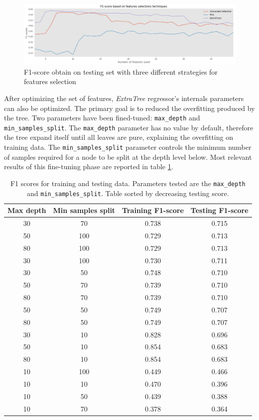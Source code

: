 \begin{figure}[!htbp]
    \centering
    \includegraphics[width=15cm]{images/feature_selection.png}
    \caption[F1-score based on feature selection]{F1-score obtain on testing set with three different strategies for features selection}
    \label{fig:feature-selection}
\end{figure}

After optimizing the set of features, \textit{ExtraTree} regressor's internals parameters can also be optimized. The primary goal is to reduced the overfitting produced by the tree. Two parameters have been fined-tuned: \texttt{max\_depth} and \texttt{min\_samples\_split}. The \texttt{max\_depth} parameter has no value by default, therefore the tree expand itself until all leaves are pure, explaining the overfitting on training data. The \texttt{min\_samples\_split} parameter controls the minimum number of samples required for a node to be split at the depth level below. Most relevant results of this fine-tuning phase are reported in table \ref{tab:tree-fine-tune}.

\begin{table}[!htbp]
    \centering
    \begin{tabular}{c|c|c|c}
    \textbf{Max depth} & \textbf{Min samples split} & \textbf{Training F1-score} & \textbf{Testing F1-score} \\ \hline
    30	&  70   &  	0.738  &  0.715 \\
    50	&  100  &  	0.729  &  0.713 \\
    80	&  100  &  	0.729  &  0.713 \\
    30	&  100  &  	0.730  &  0.711 \\
    30	&  50   &  	0.748  &  0.710 \\
    50	&  70   &  	0.739  &  0.710 \\
    80	&  70   &  	0.739  &  0.710 \\
    50	&  50   &  	0.749  &  0.707 \\
    80	&  50   &  	0.749  &  0.707 \\
    30	&  10   &  	0.828  &  0.696 \\
    50	&  10   &  	0.854  &  0.683 \\
    80	&  10   &  	0.854  &  0.683 \\
    10	&  100  &  	0.449  &  0.466 \\
    10	&  10   &  	0.470  &  0.396 \\
    10	&  50   &  	0.439  &  0.388 \\
    10	&  70   &  	0.378  &  0.364 
    \end{tabular}
    \caption{F1 scores for training and testing data. Parameters tested are the \texttt{max\_depth} and \texttt{min\_samples\_split}. Table sorted by decreasing testing score.}
    \label{tab:tree-fine-tune}
\end{table}

